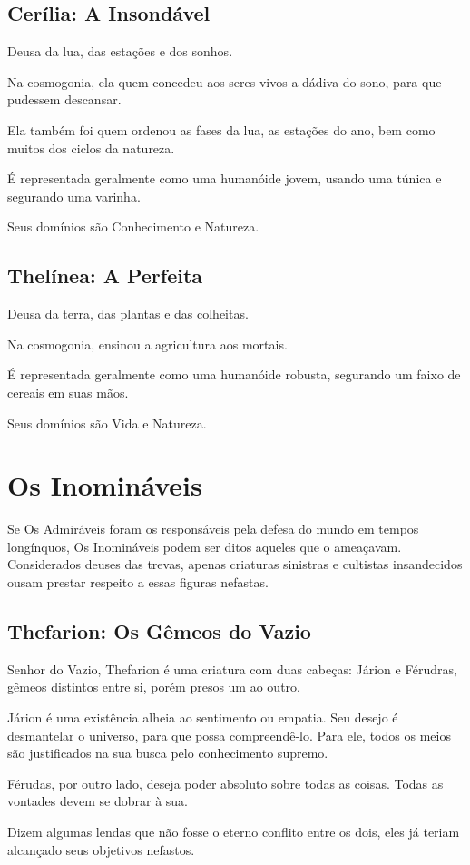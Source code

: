 \documentclass[letterpaper,twocolumn,openany]{dndbook}
\begin{document}
	\subsection{Cerília: A Insondável}
	Deusa da lua, das estações e dos sonhos.
	\par Na cosmogonia, ela quem concedeu aos seres vivos a dádiva do sono, para que pudessem descansar.
	\par Ela também foi quem ordenou as fases da lua, as estações do ano, bem como muitos dos ciclos da natureza.
	\par É representada geralmente como uma humanóide jovem, usando uma túnica e segurando uma varinha.
	\par Seus domínios são Conhecimento e Natureza.
	
	\subsection{Thelínea: A Perfeita}
	Deusa da terra, das plantas e das colheitas.
	\par Na cosmogonia, ensinou a agricultura aos mortais.
	\par É representada geralmente como uma humanóide robusta, segurando um faixo de cereais em suas mãos.
	\par Seus domínios são Vida e Natureza.
	
	\section{Os Inomináveis}
	Se Os Admiráveis foram os responsáveis pela defesa do mundo em tempos longínquos, Os Inomináveis podem ser ditos aqueles que o ameaçavam. Considerados deuses das trevas, apenas criaturas sinistras e cultistas insandecidos ousam prestar respeito a essas figuras nefastas.
	
	\subsection{Thefarion: Os Gêmeos do Vazio}
	Senhor do Vazio, Thefarion é uma criatura com duas cabeças: Járion e Férudras, gêmeos distintos entre si, porém presos um ao outro.
	\par Járion é uma existência alheia ao sentimento ou empatia. Seu desejo é desmantelar o universo, para que possa compreendê-lo. Para ele, todos os meios são justificados na sua busca pelo conhecimento supremo.
	\par Férudas, por outro lado, deseja poder absoluto sobre todas as coisas. Todas as vontades devem se dobrar à sua.
	\par Dizem algumas lendas que não fosse o eterno conflito entre os dois, eles já teriam alcançado seus objetivos nefastos.
	
\end{document}
